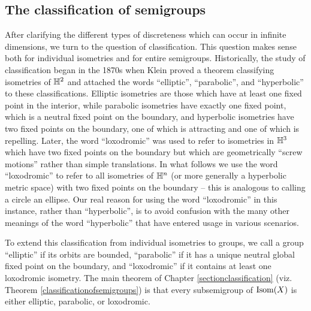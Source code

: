 \bigskip
\subsection{The classification of semigroups}

After clarifying the different types of discreteness which can occur in infinite dimensions, we turn to the question of classification. This question makes sense both for individual isometries and for entire semigroups. Historically, the study of classification began in the 1870s when Klein proved a theorem classifying isometries of $\H^2$ and attached the words ``elliptic'', ``parabolic'', and ``hyperbolic'' to these classifications. Elliptic isometries are those which have at least one fixed point in the interior, while parabolic isometries have exactly one fixed point, which is a neutral fixed point on the boundary, and hyperbolic isometries have two fixed points on the boundary, one of which is attracting and one of which is repelling. Later, the word ``loxodromic'' was used to refer to isometries in $\H^3$ which have two fixed points on the boundary but which are geometrically ``screw motions'' rather than simple translations. In what follows we use the word ``loxodromic'' to refer to all isometries of $\H^n$ (or more generally a hyperbolic metric space) with two fixed points on the boundary -- this is analogous to calling a circle an ellipse. Our real reason for using the word ``loxodromic'' in this instance, rather than ``hyperbolic'', is to avoid confusion with the many other meanings of the word ``hyperbolic'' that have entered usage in various scenarios.

To extend this classification from individual isometries to groups, we call a group ``elliptic'' if its orbits are bounded, ``parabolic'' if it has a unique neutral global fixed point on the boundary, and ``loxodromic'' if it contains at least one loxodromic isometry. The main theorem of Chapter \ref{sectionclassification} (viz. Theorem \ref{classificationofsemigroups}) is that every subsemigroup of $\operatorname{Isom}(X)$ is either elliptic, parabolic, or loxodromic.


